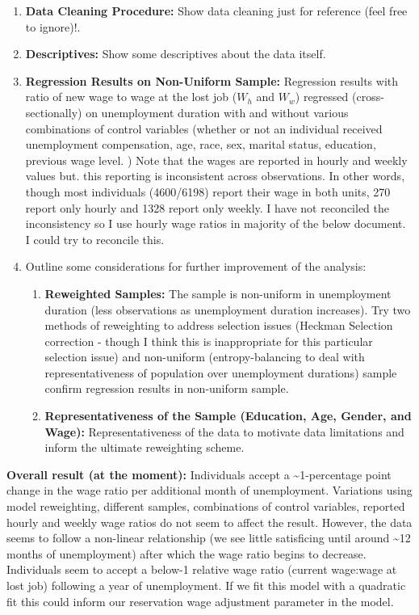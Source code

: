 \begin{enumerate}
\def\labelenumi{\arabic{enumi}.}
\tightlist
\item
  \textbf{Data Cleaning Procedure:} Show data cleaning just for
  reference (feel free to ignore)!.
\item
  \textbf{Descriptives:} Show some descriptives about the data itself.
\item
  \textbf{Regression Results on Non-Uniform Sample:} Regression results
  with ratio of new wage to wage at the lost job (\(W_{h}\) and
  \(W_{w}\)) regressed (cross-sectionally) on unemployment duration with
  and without various combinations of control variables (whether or not
  an individual received unemployment compensation, age, race, sex,
  marital status, education, previous wage level. ) Note that the wages
  are reported in hourly and weekly values but. this reporting is
  inconsistent across observations. In other words, though most
  individuals (4600/6198) report their wage in both units, 270 report
  only hourly and 1328 report only weekly. I have not reconciled the
  inconsistency so I use hourly wage ratios in majority of the below
  document. I could try to reconcile this.
\item
  Outline some considerations for further improvement of the analysis:

  \begin{enumerate}
  \def\labelenumii{\arabic{enumii}.}
  \tightlist
  \item
    \textbf{Reweighted Samples:} The sample is non-uniform in
    unemployment duration (less observations as unemployment duration
    increases). Try two methods of reweighting to address selection
    issues (Heckman Selection correction - though I think this is
    inappropriate for this particular selection issue) and non-uniform
    (entropy-balancing to deal with representativeness of population
    over unemployment durations) sample confirm regression results in
    non-uniform sample.
  \item
    \textbf{Representativeness of the Sample (Education, Age, Gender,
    and Wage):} Representativeness of the data to motivate data
    limitations and inform the ultimate reweighting scheme.
  \end{enumerate}
\end{enumerate}

\textbf{Overall result (at the moment):} Individuals accept a
\textasciitilde1-percentage point change in the wage ratio per
additional month of unemployment. Variations using model reweighting,
different samples, combinations of control variables, reported hourly
and weekly wage ratios do not seem to affect the result. However, the
data seems to follow a non-linear relationship (we see little
satisficing until around \textasciitilde12 months of unemployment) after
which the wage ratio begins to decrease. Individuals seem to accept a
below-1 relative wage ratio (current wage:wage at lost job) following a
year of unemployment. If we fit this model with a quadratic fit this
could inform our reservation wage adjustment parameter in the model.

